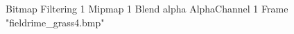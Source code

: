 {Bitmap
	{Filtering 1}
	{Mipmap 1}
	{Blend alpha}
	{AlphaChannel 1}
	{Frame "fieldrime_grass4.bmp"}
}
